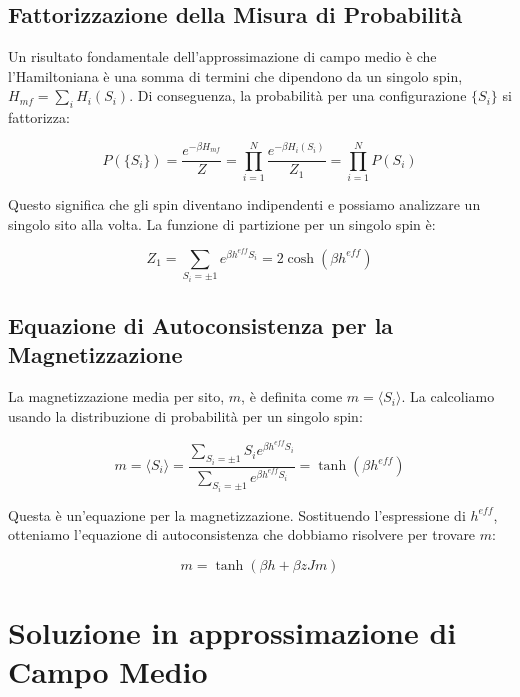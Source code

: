 \subsection*{Fattorizzazione della Misura di Probabilità}
Un risultato fondamentale dell'approssimazione di campo medio è che l'Hamiltoniana è una somma di termini che dipendono da un singolo spin, $H_{mf} = \sum_i H_i(S_i)$.
Di conseguenza, la probabilità per una configurazione $\{S_i\}$ si fattorizza:

\begin{equation} \label{eq:ch17_7}
P(\{S_i\}) = \frac{e^{-\beta H_{mf}}}{Z} = \prod_{i=1}^N \frac{e^{-\beta H_i(S_i)}}{Z_1} = \prod_{i=1}^N P(S_i)
\end{equation}

Questo significa che gli spin diventano indipendenti e possiamo analizzare un singolo sito alla volta. La funzione di partizione per un singolo spin è:

\begin{equation} \label{eq:ch17_8}
Z_{1} = \sum_{S_i = \pm 1} e^{\beta h^{eff} S_i} = 2 \cosh(\beta h^{eff})
\end{equation}

\subsection*{Equazione di Autoconsistenza per la Magnetizzazione}
La magnetizzazione media per sito, $m$, è definita come $m = \langle S_i \rangle$. La calcoliamo usando la distribuzione di probabilità per un singolo spin:

\begin{equation} \label{eq:ch17_9}
m = \langle S_i \rangle = \frac{\sum_{S_i=\pm 1} S_i e^{\beta h^{eff} S_i}}{\sum_{S_i=\pm 1} e^{\beta h^{eff} S_i}} = \tanh(\beta h^{eff})
\end{equation}

Questa è un'equazione per la magnetizzazione. Sostituendo l'espressione di $h^{eff}$, otteniamo l'equazione di autoconsistenza che dobbiamo risolvere per trovare $m$:

\begin{equation} \label{eq:ch17_10}
m = \tanh(\beta h + \beta z J m)
\end{equation}

\section{Soluzione in approssimazione di Campo Medio}

